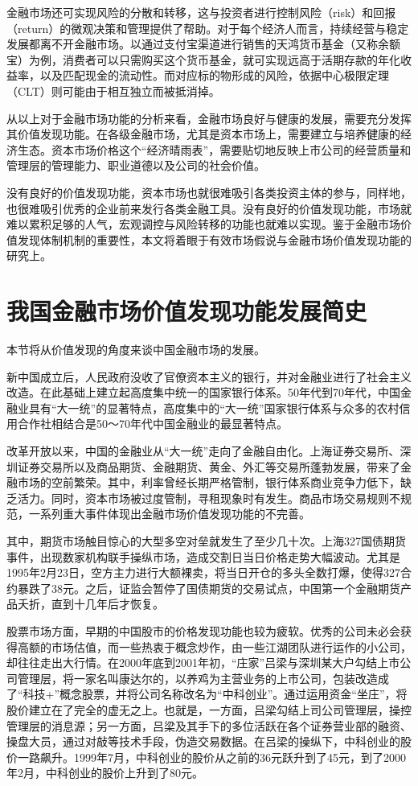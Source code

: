 \documentclass[twoside,longtitle]{LZUthesis}
\begin{document}
金融市场还可实现风险的分散和转移，这与投资者进行控制风险（risk）和回报（return）的微观决策和管理提供了帮助。对于每个经济人而言，持续经营与稳定发展都离不开金融市场。以通过支付宝渠道进行销售的天鸿货币基金（又称余额宝）为例，消费者可以只需购买这个货币基金，就可实现远高于活期存款的年化收益率，以及匹配现金的流动性。而对应标的物形成的风险，依据中心极限定理（CLT）则可能由于相互独立而被抵消掉。

从以上对于金融市场功能的分析来看，金融市场良好与健康的发展，需要充分发挥其价值发现功能。在各级金融市场，尤其是资本市场上，需要建立与培养健康的经济生态。资本市场价格这个“经济晴雨表”，需要贴切地反映上市公司的经营质量和管理层的管理能力、职业道德以及公司的社会价值。

没有良好的价值发现功能，资本市场也就很难吸引各类投资主体的参与，同样地，也很难吸引优秀的企业前来发行各类金融工具。没有良好的价值发现功能，市场就难以累积足够的人气，宏观调控与风险转移的功能也就难以实现。鉴于金融市场价值发现体制机制的重要性，本文将着眼于有效市场假说与金融市场价值发现功能的研究上。

\section{我国金融市场价值发现功能发展简史}
本节将从价值发现的角度来谈中国金融市场的发展\cite{zhouxiaochuan2010}。

新中国成立后，人民政府没收了官僚资本主义的银行，并对金融业进行了社会主义改造。在此基础上建立起高度集中统一的国家银行体系。50年代到70年代，中国金融业具有“大一统”的显著特点，高度集中的“大一统”国家银行体系与众多的农村信用合作社相结合是50～70年代中国金融业的最显著特点。

改革开放以来，中国的金融业从“大一统”走向了金融自由化。上海证券交易所、深圳证券交易所以及商品期货、金融期货、黄金、外汇等交易所蓬勃发展，带来了金融市场的空前繁荣。其中，利率曾经长期严格管制，银行体系商业竞争力低下，缺乏活力。同时，资本市场被过度管制，寻租现象时有发生。商品市场交易规则不规范，一系列重大事件体现出金融市场价值发现功能的不完善。

其中，期货市场触目惊心的大型多空对垒就发生了至少几十次。上海327国债期货事件，出现数家机构联手操纵市场，造成交割日当日价格走势大幅波动。尤其是1995年2月23日，空方主力进行大额裸卖，将当日开仓的多头全数打爆，使得327合约暴跌了38元。之后，证监会暂停了国债期货的交易试点，中国第一个金融期货产品夭折，直到十几年后才恢复。

股票市场方面，早期的中国股市的价格发现功能也较为疲软。优秀的公司未必会获得高额的市场估值，而一些热衷于概念炒作，由一些江湖团队进行运作的小公司，却往往走出大行情。在2000年底到2001年初，“庄家”吕梁与深圳某大户勾结上市公司管理层，将一家名叫康达尔的，以养鸡为主营业务的上市公司，包装改造成了“科技+”概念股票，并将公司名称改名为“中科创业”。通过运用资金“坐庄”，将股价建立在了完全的虚无之上。也就是，一方面，吕梁勾结上司公司管理层，操控管理层的消息源；另一方面，吕梁及其手下的多位活跃在各个证券营业部的融资、操盘大员，通过对敲等技术手段，伪造交易数据。在吕梁的操纵下，中科创业的股价一路飙升。1999年7月，中科创业的股价从之前的36元跃升到了45元，到了2000年2月，中科创业的股价上升到了80元。
\end{document}
